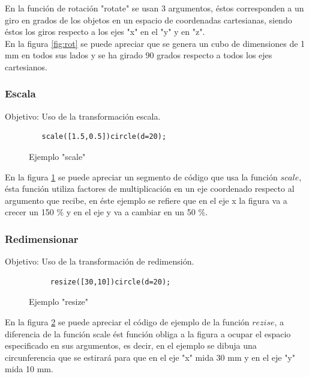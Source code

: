 \documentclass{article}
\begin{document}
En la función de rotación "rotate" se usan 3 argumentos, éstos corresponden a un giro en grados de los objetos en un espacio de coordenadas cartesianas, siendo éstos los giros respecto a los ejes "x" en el "y" y en "z".\\

En la figura \ref{fig:rot} se puede apreciar que se genera un cubo de dimensiones de 1 mm en todos sus lados y se ha girado 90 grados respecto a todos los ejes cartesianos.\\

\subsubsection{Escala}

Objetivo: Uso de la transformación escala.\citep{OpenSCS}\\


\begin{figure}
    \centering
    \begin{verbatim}
   scale([1.5,0.5])circle(d=20);
\end{verbatim}
    \caption{Ejemplo "scale"}
    \label{fig:my_label}
\end{figure}

En la figura \ref{fig:my_label} se puede apreciar un segmento de código que usa la función $scale$, ésta función utiliza factores de multiplicación en un eje coordenado respecto al argumento que recibe, en éste ejemplo se refiere que en el eje x la figura va a crecer un 150 $\%$ y en el eje y va a cambiar en un 50 $\%$.\\

\subsubsection{Redimensionar}

Objetivo: Uso de la transformación de redimensión.\citep{OpenSCS}\\

\begin{figure}
    \centering
   \begin{verbatim}
     resize([30,10])circle(d=20);
\end{verbatim}
    \caption{Ejemplo "resize"}
    \label{fig:rez}
\end{figure}

En la figura \ref{fig:rez} se puede apreciar el código de ejemplo de la función $rezise$, a diferencia de la función scale ést función obliga a la figura a ocupar el espacio especificado en sus argumentos, es decir, en el ejemplo se dibuja una circunferencia que se estirará para que en el eje "x" mida 30 mm y en el eje "y" mida 10 mm.\\
\end{document}
